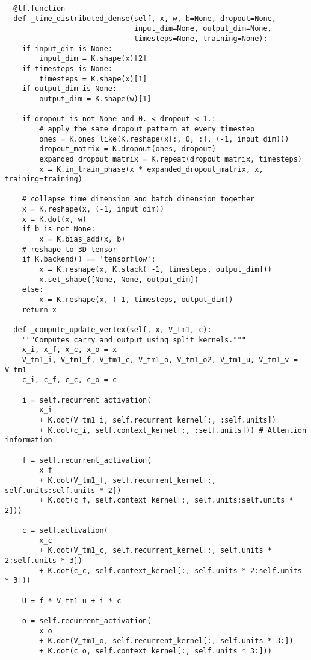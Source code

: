 \begin{lstlisting}
  @tf.function
  def _time_distributed_dense(self, x, w, b=None, dropout=None,
                              input_dim=None, output_dim=None,
                              timesteps=None, training=None):
    if input_dim is None:
        input_dim = K.shape(x)[2]
    if timesteps is None:
        timesteps = K.shape(x)[1]
    if output_dim is None:
        output_dim = K.shape(w)[1]

    if dropout is not None and 0. < dropout < 1.:
        # apply the same dropout pattern at every timestep
        ones = K.ones_like(K.reshape(x[:, 0, :], (-1, input_dim)))
        dropout_matrix = K.dropout(ones, dropout)
        expanded_dropout_matrix = K.repeat(dropout_matrix, timesteps)
        x = K.in_train_phase(x * expanded_dropout_matrix, x, training=training)

    # collapse time dimension and batch dimension together
    x = K.reshape(x, (-1, input_dim))
    x = K.dot(x, w)
    if b is not None:
        x = K.bias_add(x, b)
    # reshape to 3D tensor
    if K.backend() == 'tensorflow':
        x = K.reshape(x, K.stack([-1, timesteps, output_dim]))
        x.set_shape([None, None, output_dim])
    else:
        x = K.reshape(x, (-1, timesteps, output_dim))
    return x

  def _compute_update_vertex(self, x, V_tm1, c):
    """Computes carry and output using split kernels."""
    x_i, x_f, x_c, x_o = x
    V_tm1_i, V_tm1_f, V_tm1_c, V_tm1_o, V_tm1_o2, V_tm1_u, V_tm1_v = V_tm1
    c_i, c_f, c_c, c_o = c

    i = self.recurrent_activation(
        x_i
        + K.dot(V_tm1_i, self.recurrent_kernel[:, :self.units])
        + K.dot(c_i, self.context_kernel[:, :self.units])) # Attention information

    f = self.recurrent_activation(
        x_f
        + K.dot(V_tm1_f, self.recurrent_kernel[:, self.units:self.units * 2])
        + K.dot(c_f, self.context_kernel[:, self.units:self.units * 2]))

    c = self.activation(
        x_c
        + K.dot(V_tm1_c, self.recurrent_kernel[:, self.units * 2:self.units * 3])
        + K.dot(c_c, self.context_kernel[:, self.units * 2:self.units * 3]))

    U = f * V_tm1_u + i * c

    o = self.recurrent_activation(
        x_o
        + K.dot(V_tm1_o, self.recurrent_kernel[:, self.units * 3:])
        + K.dot(c_o, self.context_kernel[:, self.units * 3:]))


\end{lstlisting}

